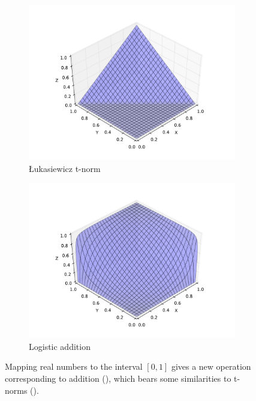 \documentclass[preprint,leqno]{elsarticle}
\begin{document}
\begin{figure}
  \begin{subfigure}{0.49\textwidth}
    \includegraphics[width=\textwidth]{lukasiewicz.pdf}
    \caption{\L ukasiewicz t-norm}
    \label{fig:lukasiewicz}
  \end{subfigure}
  \begin{subfigure}{0.49\textwidth}
    \includegraphics[width=\textwidth]{rieszfunc.pdf}
    \caption{Logistic addition}
    \label{fig:logistic}
  \end{subfigure}
  \caption{Mapping real numbers to the interval $[0,1]$ gives a new
    operation corresponding to addition (), which
    bears some similarities to t-norms ().}
\end{figure}
\end{document}
